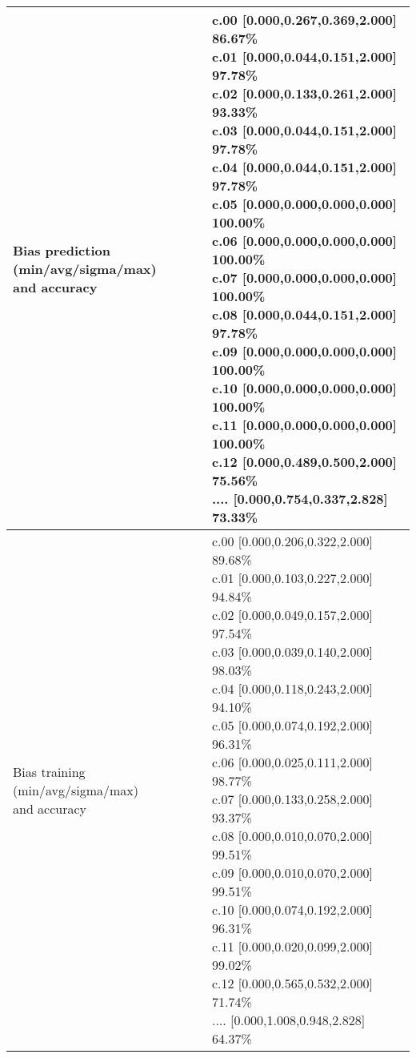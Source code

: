 \begin{center}
\begin{tabular}{|l|l|}
\hline
\makecell{Bias prediction (min/avg/sigma/max)\\and accuracy}&\makecell{c.00 [0.000,0.267,0.369,2.000] 86.67\%\\
c.01 [0.000,0.044,0.151,2.000] 97.78\%\\
c.02 [0.000,0.133,0.261,2.000] 93.33\%\\
c.03 [0.000,0.044,0.151,2.000] 97.78\%\\
c.04 [0.000,0.044,0.151,2.000] 97.78\%\\
c.05 [0.000,0.000,0.000,0.000] 100.00\%\\
c.06 [0.000,0.000,0.000,0.000] 100.00\%\\
c.07 [0.000,0.000,0.000,0.000] 100.00\%\\
c.08 [0.000,0.044,0.151,2.000] 97.78\%\\
c.09 [0.000,0.000,0.000,0.000] 100.00\%\\
c.10 [0.000,0.000,0.000,0.000] 100.00\%\\
c.11 [0.000,0.000,0.000,0.000] 100.00\%\\
c.12 [0.000,0.489,0.500,2.000] 75.56\%\\
.... [0.000,0.754,0.337,2.828] 73.33\%\\
}\\

\hline
\makecell{Bias training (min/avg/sigma/max)\\and accuracy}&\makecell{c.00 [0.000,0.206,0.322,2.000] 89.68\%\\
c.01 [0.000,0.103,0.227,2.000] 94.84\%\\
c.02 [0.000,0.049,0.157,2.000] 97.54\%\\
c.03 [0.000,0.039,0.140,2.000] 98.03\%\\
c.04 [0.000,0.118,0.243,2.000] 94.10\%\\
c.05 [0.000,0.074,0.192,2.000] 96.31\%\\
c.06 [0.000,0.025,0.111,2.000] 98.77\%\\
c.07 [0.000,0.133,0.258,2.000] 93.37\%\\
c.08 [0.000,0.010,0.070,2.000] 99.51\%\\
c.09 [0.000,0.010,0.070,2.000] 99.51\%\\
c.10 [0.000,0.074,0.192,2.000] 96.31\%\\
c.11 [0.000,0.020,0.099,2.000] 99.02\%\\
c.12 [0.000,0.565,0.532,2.000] 71.74\%\\
.... [0.000,1.008,0.948,2.828] 64.37\%\\
}\\
\hline
\end{tabular}\
\end{center}
